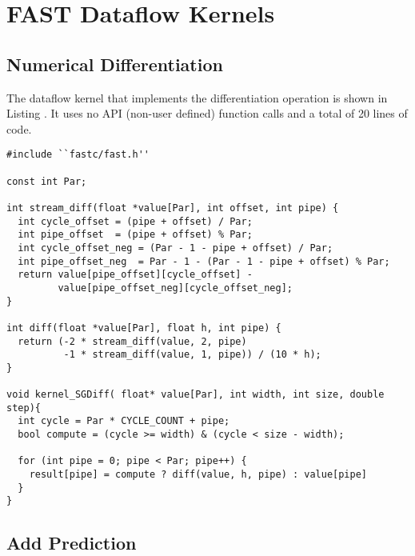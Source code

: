 \chapter{FAST Dataflow Kernels}

\section{Numerical Differentiation}

The \FAST{} dataflow kernel that implements the differentiation
operation is shown in Listing {}. It uses no API (non-user defined)
function calls and a total of 20 lines of code.

\begin{lstlisting}
#include ``fastc/fast.h''

const int Par;

int stream_diff(float *value[Par], int offset, int pipe) {
  int cycle_offset = (pipe + offset) / Par;
  int pipe_offset  = (pipe + offset) % Par;
  int cycle_offset_neg = (Par - 1 - pipe + offset) / Par;
  int pipe_offset_neg  = Par - 1 - (Par - 1 - pipe + offset) % Par;
  return value[pipe_offset][cycle_offset] -
         value[pipe_offset_neg][cycle_offset_neg];
}

int diff(float *value[Par], float h, int pipe) {
  return (-2 * stream_diff(value, 2, pipe)
          -1 * stream_diff(value, 1, pipe)) / (10 * h);
}

void kernel_SGDiff( float* value[Par], int width, int size, double step){
  int cycle = Par * CYCLE_COUNT + pipe;
  bool compute = (cycle >= width) & (cycle < size - width);

  for (int pipe = 0; pipe < Par; pipe++) {
    result[pipe] = compute ? diff(value, h, pipe) : value[pipe]
  }
}
\end{lstlisting}

\section{Add Prediction}
